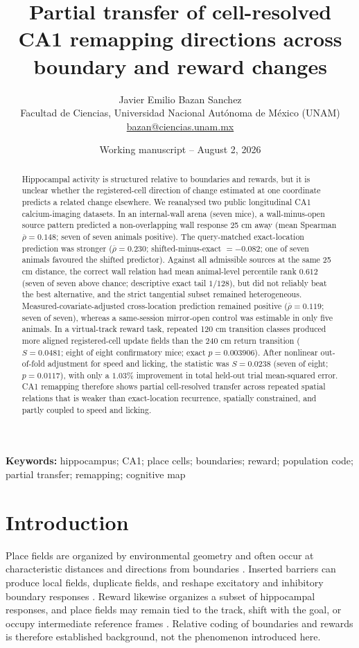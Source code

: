 \documentclass[10pt,twocolumn]{article}
\title{\textbf{Partial transfer of cell-resolved CA1 remapping directions across boundary and reward changes}}
\author{Javier Emilio Bazan Sanchez\\
\small Facultad de Ciencias, Universidad Nacional Aut\'onoma de M\'exico
(UNAM)\\
\small\href{mailto:bazan@ciencias.unam.mx}{bazan@ciencias.unam.mx}}
\date{Working manuscript -- August 2, 2026}
\newcommand{\meanrho}{\overline{\rho}}
\begin{document}
\maketitle

\begin{abstract}
Hippocampal activity is structured relative to boundaries and rewards, but it
is unclear whether the registered-cell direction of change estimated at one
coordinate predicts a related change elsewhere. We reanalysed two public
longitudinal CA1 calcium-imaging datasets. In an internal-wall arena (seven
mice), a wall-minus-open source pattern
predicted a non-overlapping wall response 25 cm away (mean Spearman
$\meanrho=0.148$; seven of seven animals positive). The query-matched
exact-location prediction was stronger ($\meanrho=0.230$;
shifted-minus-exact $=-0.082$; one of seven animals favoured the shifted
predictor). Against all admissible sources at the same 25 cm distance, the
correct wall relation had mean animal-level percentile rank $0.612$ (seven of
seven above chance; descriptive exact tail $1/128$), but did not reliably beat
the best alternative, and the strict tangential subset remained heterogeneous.
Measured-covariate-adjusted cross-location prediction
remained positive ($\meanrho=0.119$; seven of seven), whereas a same-session
mirror-open control was estimable in only five animals. In a virtual-track
reward task, repeated 120 cm transition classes produced more aligned
registered-cell update fields than the 240 cm return transition
($S=0.0481$; eight of eight confirmatory mice; exact $p=0.003906$). After
nonlinear out-of-fold adjustment for speed and licking, the statistic was
$S=0.0238$ (seven of eight; $p=0.0117$), with only a $1.03\%$ improvement in
total held-out trial mean-squared error. CA1 remapping therefore shows partial
cell-resolved transfer across repeated spatial relations that is weaker than
exact-location recurrence, spatially constrained, and partly coupled to speed
and licking.
\end{abstract}

\noindent\textbf{Keywords:} hippocampus; CA1; place cells; boundaries;
reward; population code; partial transfer; remapping; cognitive map

\section{Introduction}

Place fields are organized by environmental geometry and often occur at
characteristic distances and directions from boundaries
\citep{OKeefeBurgess1996,HartleyEtAl2000,BarryEtAl2006,LeverEtAl2009}. Inserted
barriers can produce local fields, duplicate fields, and reshape excitatory and
inhibitory boundary responses
\citep{RivardEtAl2004,WangMonacoKnierim2020,MuessigEtAl2024}. Reward likewise
organizes a subset of hippocampal responses, and place fields may remain tied
to the track, shift with the goal, or occupy intermediate reference frames
\citep{GauthierTank2018,QianEtAl2025,SosaEtAl2025,YaghoubiEtAl2026}. Relative
coding of boundaries and rewards is therefore established background, not the
phenomenon introduced here.
\end{document}
